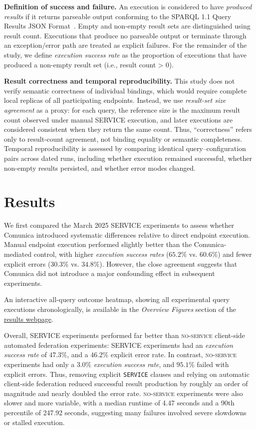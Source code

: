 \documentclass[runningheads]{llncs}
\begin{document}
\textbf{Definition of success and failure.}
An execution is considered to have \emph{produced results} if it returns parseable output conforming to the SPARQL 1.1 Query Results JSON Format~\cite{sparql11resultsjson}. 
Empty and non-empty result sets are distinguished using result count. 
Executions that produce no parseable output or terminate through an exception/error path are treated as explicit failures.
For the remainder of the study, we define \emph{execution success rate} as the proportion of executions that have produced a non-empty result set (i.e., result count > 0). 

\textbf{Result correctness and temporal reproducibility.}
This study does not verify semantic correctness of individual bindings, which would require complete local replicas of all participating endpoints. 
Instead, we use \textit{result-set size agreement} as a proxy: for each query, the reference size is the maximum result count observed under manual \textsc{SERVICE} execution, and later executions are considered consistent when they return the same count. 
Thus, ``correctness'' refers only to result-count agreement, not binding equality or semantic completeness. 
Temporal reproducibility is assessed by comparing identical query--configuration pairs across dated runs, including whether execution remained successful, whether non-empty results persisted, and whether error modes changed.


\section{Results}\label{sec5}
We first compared the March 2025 \textsc{SERVICE} experiments to assess whether Comunica introduced systematic differences relative to direct endpoint execution.
Manual endpoint execution performed slightly better than the Comunica-mediated control, with higher \emph{execution success rates} (\(65.2\%\) vs. \(60.6\%\)) and fewer explicit errors (\(30.3\%\) vs. \(34.8\%\)).
However, the close agreement suggests that Comunica did not introduce a major confounding effect in subsequent experiments.

An interactive all-query outcome heatmap, showing all experimental query executions chronologically, is available in the \textit{Overview Figures} section of the \href{https://ecrum19.github.io/fed-survey-results/}{results webpage}.

Overall, \textsc{SERVICE} experiments performed far better than \textsc{no-service} client-side automated federation experiments: \textsc{SERVICE} experiments had an \emph{execution success rate} of \(47.3\%\), and a \(46.2\%\) explicit error rate.
In contrast, \textsc{no-service} experiments had only a \(3.0\%\) \emph{execution success rate}, and \(95.1\%\) failed with explicit errors.
Thus, removing explicit \texttt{SERVICE} clauses and relying on automatic client-side federation reduced successful result production by roughly an order of magnitude and nearly doubled the error rate.
\textsc{no-service} experiments were also slower and more variable, with a median runtime of 4.47 seconds and a 90th percentile of 247.92 seconds, suggesting many failures involved severe slowdowns or stalled execution.
\end{document}
